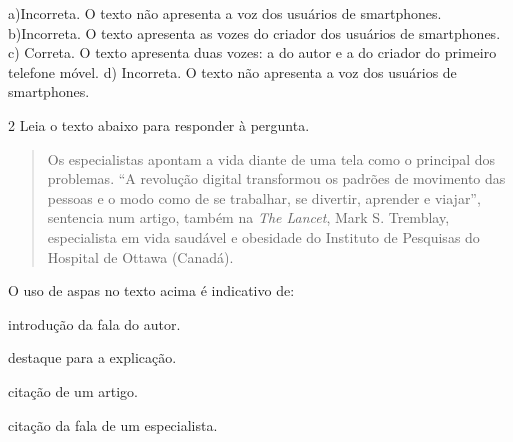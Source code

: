 {{a)Incorreta. O texto não apresenta a voz dos usuários de smartphones.
b)Incorreta. O texto apresenta as vozes do criador dos usuários de
smartphones. 
c) Correta. O texto apresenta duas vozes: a do autor e a do criador
do primeiro telefone móvel.
d) Incorreta. O texto não apresenta a voz dos usuários de smartphones.}

\num{2} Leia o texto abaixo para responder à pergunta.

\begin{quote}

Os especialistas apontam a vida diante de uma tela como o principal dos
problemas. ``A revolução digital transformou os padrões de movimento das
pessoas e o modo como de se trabalhar, se divertir, aprender e viajar'',
sentencia num artigo, também na \textit{The Lancet}, Mark S. Tremblay,
especialista em vida saudável e obesidade do Instituto de Pesquisas do
Hospital de Ottawa (Canadá).

\end{quote}


O uso de aspas no texto acima é indicativo de:

\begin{escolha}

  \item introdução da fala do autor.

  \item destaque para a explicação.

  \item citação de um artigo.

  \item citação da fala de um especialista.

\end{escolha}

}
